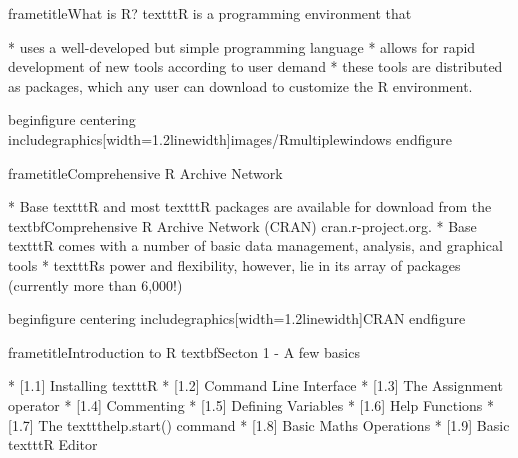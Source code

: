  	
 	
 		
 		frametitle{What is R?}
 		texttt{R} is a programming environment that
 		
 			         * uses a well-developed but simple programming language
 			         * allows for rapid development of new tools according to user demand
 			         * these tools are distributed as packages, which any user can download to customize the R
 			environment.
 		
 	
 	
 		begin{figure}
 			centering
 			includegraphics[width=1.2linewidth]{images/Rmultiplewindows}
 		end{figure}
 		
 	   
 	
 	
 		frametitle{Comprehensive R Archive Network}
 		
 			         * Base texttt{R} and most texttt{R} packages are available for download from the textbf{Comprehensive R Archive Network}
 			(CRAN) cran.r-project.org. 
 			         * Base texttt{R} comes with a number of basic data management,
 			analysis, and graphical tools 
 			         * texttt{R}s power and flexibility, however, lie in its array of packages
 			(currently more than 6,000!)
 		
 		
 	
  	
 		begin{figure}
centering
includegraphics[width=1.2linewidth]{CRAN}
end{figure}
 	
 	
 		frametitle{Introduction to R}
textbf{Secton 1 - A few basics} 
		
 			        * [1.1] Installing texttt{R}      
 			        * [1.2] Command Line Interface     
 			        * [1.3] The Assignment operator     
 			        * [1.4] Commenting      
 			        * [1.5] Defining Variables     
 			        * [1.6] Help Functions      
 			        * [1.7] The texttt{help.start()} command     
 			        * [1.8] Basic Maths Operations     
 			        * [1.9] Basic texttt{R} Editor      
 		
